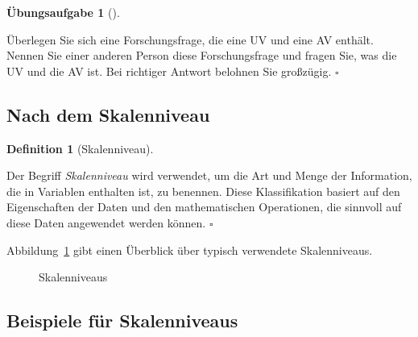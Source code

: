 \documentclass[
  letterpaper,
]{scrbook}
\theoremstyle{definition}
\theoremstyle{definition}
\newtheorem{definition}{Definition}[chapter]
\theoremstyle{definition}
\newtheorem{exercise}{Übungsaufgabe}[chapter]
\theoremstyle{remark}
\begin{document}
\begin{exercise}[]\protect\hypertarget{exr-uvav}{}\label{exr-uvav}

Überlegen Sie sich eine Forschungsfrage, die eine UV und eine AV
enthält. Nennen Sie einer anderen Person diese Forschungsfrage und
fragen Sie, was die UV und die AV ist. Bei richtiger Antwort belohnen
Sie großzügig. \(\square\)

\end{exercise}

\subsection{Nach dem Skalenniveau}\label{nach-dem-skalenniveau}

\begin{definition}[Skalenniveau]\protect\hypertarget{def-skalenniveau}{}\label{def-skalenniveau}

Der Begriff \emph{Skalenniveau} wird verwendet, um die Art und Menge der
Information, die in Variablen enthalten ist, zu benennen. Diese
Klassifikation basiert auf den Eigenschaften der Daten und den
mathematischen Operationen, die sinnvoll auf diese Daten angewendet
werden können. \(\square\)

\end{definition}

Abbildung~\ref{fig-skalenniveau} gibt einen Überblick über typisch
verwendete Skalenniveaus.

\begin{figure}


\caption{\label{fig-skalenniveau}Skalenniveaus}

\end{figure}%

\subsection{Beispiele für
Skalenniveaus}\label{beispiele-fuxfcr-skalenniveaus}
\end{document}
